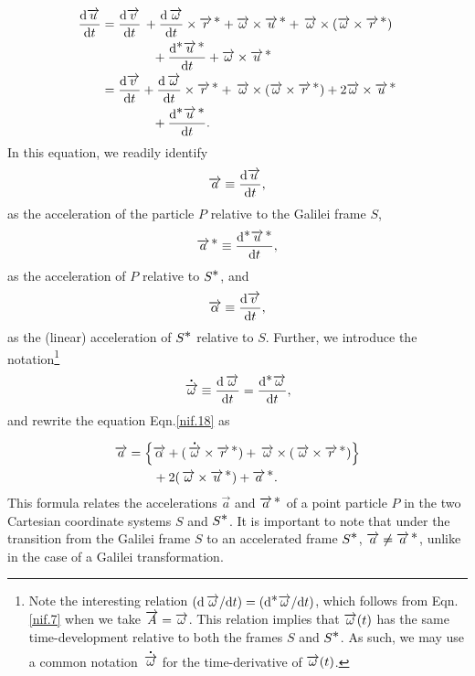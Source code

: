 \begin{align}
\dv{\vec{u}}{t}&=
\dv{\vec{v}}{t} \, + \dv{\,\vec{\gkw}}{t}\times \svec{r}
 +\vec{\gkw} \times\svec{u}+  
\,\vec{\gkw}\times(\vec{\gkw}\times \svec{r})\notag \\
&\qquad \qquad  +\dv{^{\bst}\svec{u}}{t}
+ \vec{\gkw} \times \svec{u} \notag \\
& = \dv{\vec{v}}{t}
+\dv{\,\vec{\gkw}}{t}\times \svec{r} +
\,\vec{\gkw}\times (\vec{\gkw} \times \svec{r})
+2 \vec{\gkw}\times\svec{u}\notag \\
&\qquad \qquad +\dv{^{\bst}\svec{u}}{t}.
\end{align}
In this equation, we readily identify 
\begin{align}\label{nif.19} 
\vec{a}\equiv \dv{\vec{u}}{t},
\end{align}
as the acceleration of the particle $P$ relative to the 
Galilei frame $S$,
\begin{align}\label{nif.20}
\svec{a} \equiv
\dv{^{\bst}\svec{u}}{t},
\end{align}
as the acceleration of $P$ relative to $S^\bst$, and 
\begin{align}\label{nif.21} \vec{\alpha}\equiv 
\dv{\vec{v}}{t},
\end{align}
as the (linear) acceleration of $S^\bst$ relative to 
$S$. Further, we  introduce the notation\footnote{Note 
the interesting relation $(\dd \,\vec{\gkw}/\dd t)= 
(\dd ^{\bst }\vec{\gkw}/\dd t)$, which follows from 
Eqn.\eqref{nif.7} when we take $\vec{A}=\vec{\gkw}$. 
This relation implies that $\vec{\gkw}(t)$ has the same 
time-development relative to both the frames $S$ and 
$S^\bst$. As such, we may use a common notation 
$\dotup{\,\vec{\gkw}}$ for the 
time-derivative of $\vec{\gkw}(t)$.}
\begin{align}\label{nif.22}
 \dot{\,\vec{\gkw}}\equiv
\dv{\,\vec{\gkw}}{t}=
\dv{^{\bst}\vec{\gkw}}{t},
\end{align}
and rewrite the equation Eqn.\eqref{nif.18} as
\begin{align}\label{nif.23}
\vec{a}& =\Big\{ \vec{\alpha} +(\dotup{\,\vec{\gkw}}
\times \svec{r}) + \,\vec{\gkw}\times ( \,\vec{\gkw} 
\times \svec{r} )\Big \}\notag\\&\qquad+
2(\,\vec{\gkw}\times\svec{u}) +\svec{a}.
\end{align}
This formula relates the accelerations $\vec{a}$ and 
$\svec{a}$ of a point particle $P$ in the two Cartesian 
coordinate systems $S$ and $S^\bst$. It is important to 
note that under the transition from the Galilei frame 
$S$ to an accelerated frame $S^\bst$, $\vec{a}\neq 
\svec{a}$, unlike in the case of a Galilei 
transformation.

